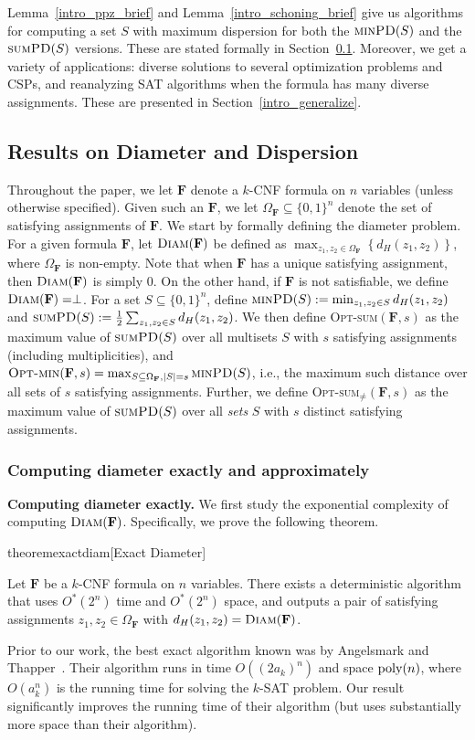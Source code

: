 \documentclass[11pt, letterpaper]{article}
\theoremstyle{definition}
\newcommand{\f}{\mathbf{F}}
\newcommand{\Om}{\Omega_{\f}}
\newcommand{\PD}{\textsc{minPD}}
\newcommand{\SPD}{\textsc{sumPD}}
\newcommand{\opts}{\textsc{Opt-sum}}
\newcommand{\optm}{\textsc{Opt-min}}
\newcommand{\D}{\textsc{Diam}}
\newcommand{\poly}{\mbox{\rm poly}}
\begin{document}
Lemma~\ref{intro_ppz_brief} and Lemma~\ref{intro_schoning_brief} give us algorithms for computing a set $S$ with maximum dispersion for both the $\PD(S)$ and the $\SPD(S)$ versions. These are stated formally in Section~\ref{intro_results}. Moreover, we get a variety of applications: diverse solutions to several optimization problems and CSPs, and reanalyzing SAT algorithms when the formula has many diverse assignments. These are presented in Section~\ref{intro_generalize}.




\subsection{Results on Diameter and Dispersion}\label{intro_results}

Throughout the paper, we let  $\f$ denote a $k$-CNF formula on $n$ variables (unless otherwise specified). Given such an $\f$, we let $\Omega_{\f} \subseteq \{0,1\}^n$ denote the set of satisfying assignments of $\f$. We start by formally defining the diameter problem. For a given formula $\f$, let $\D(\f)$ be defined as $\max_{z_1, z_2 \in \Om} \left\{d_H(z_1, z_2)\right\}$, where $\Omega_\f$ is non-empty. Note that when $\f$ has a unique satisfying assignment, then $\D(\f)$ is simply $0$. On the other hand, if $\f$ is not satisfiable, we define $\D(\f) = \perp$. For a set $S\subseteq \{0,1\}^n$, define  $\PD(S):=\min_{z_1,z_2 \in S} d_{H}(z_1,z_2)$ and $\SPD(S):=\frac{1}{2}\sum_{z_1,z_2 \in S} d_{H}(z_1,z_2)$. We then define \opts$(\f,s)$ as the maximum value of $\SPD(S)$ over all multisets $S$ with $s$ satisfying assignments (including multiplicities), and \\$\optm(\f,s) = \max_{S \subseteq \Om, |S|=s} \PD(S)$, i.e., the maximum such distance over all sets of $s$ satisfying assignments. Further, we define \opts$_\neq(\f,s)$ as the maximum value of $\SPD(S)$ over all \emph{sets} $S$ with $s$ distinct satisfying assignments. 
\subsubsection{Computing diameter exactly and approximately}
\label{sec:intro-dia}
\medskip\noindent
\textbf{Computing diameter exactly.} We first study the exponential complexity of computing $\D(\f)$. Specifically, we prove the following theorem. 
\begin{restatable}{theorem}{exactdiam}[Exact Diameter] \label{thm:exactdiam}

 Let $\f$ be a $k$-CNF formula on $n$ variables. 
 There exists a deterministic algorithm that uses $O^*(2^n)$ time and $O^*(2^n)$ space, and outputs a pair of satisfying assignments $z_1, z_2 \in \Omega_\f$ with $d_H(z_1,z_2)= \D(\f)$. 
\end{restatable}
Prior to our work, the best exact algorithm known
was by Angelsmark and Thapper~\cite{AngelsmarkThapperCSP}. Their algorithm runs in time $O((2a_k)^n)$ and space $\poly(n)$, where $O(a_k^n)$ is the running time for solving the $k$-SAT problem. Our result significantly improves the running time of their algorithm (but uses substantially more space than their algorithm). 
\end{document}
